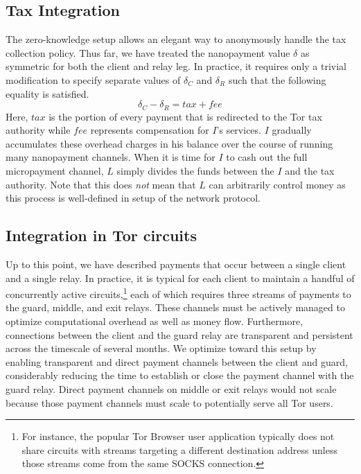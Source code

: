 \subsection{Tax Integration}

The zero-knowledge setup allows an elegant way to anonymously handle the tax
collection policy. Thus far, we have treated the nanopayment value $\delta$ as
symmetric for both the client and relay leg. In practice, it requires only a
trivial modification to specify separate values of $\delta_C$ and $\delta_R$
such that the following equality is satisfied.
\begin{equation}
  \delta_C - \delta_R = \mathit{tax} + \mathit{fee}
  \label{eq:payment}
\end{equation}
Here, $\mathit{tax}$ is the portion of every payment that is redirected to the Tor tax
authority while $\mathit{fee}$ represents compensation for $I$'s services. $I$ gradually
accumulates these overhead charges in his balance over the course of running
many nanopayment channels. When it is time for $I$ to cash out the full
micropayment channel, $L$ simply divides the funds between the $I$ and the tax
authority. Note that this does \emph{not} mean that $L$ can arbitrarily control
money as this process is well-defined in setup of the network protocol.

\subsection{Integration in Tor circuits}
Up to this point, we have described payments that occur between a single client
and a single relay. In practice, it is typical for each client to maintain a
handful of concurrently active circuits,\footnote{For instance, the popular Tor
  Browser user application typically does not share circuits with streams
  targeting a different destination address unless those streams come from the
  same SOCKS connection.} each of which requires three streams of payments to
the guard, middle, and exit relays. These channels must be actively managed to
optimize computational overhead as well as money flow. Furthermore, connections
between the client and the guard relay are transparent and persistent across the
timescale of several months. We optimize toward this setup by enabling
transparent and direct payment channels between the client and guard,
considerably reducing the time to establish or close the payment channel with
the guard relay. Direct payment channels on middle or exit relays would not
scale because those payment channels must scale to potentially serve all Tor
users. %


